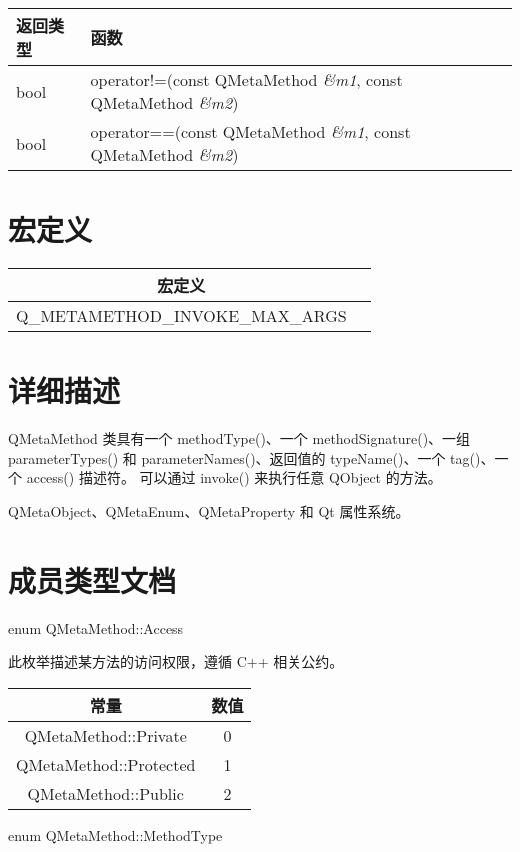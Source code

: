 \begin{tabular}{|l|l|}
\hline
返回类型 &	函数 \\ 
\hline
bool  &	operator!=(const QMetaMethod \emph{\&m1}, const QMetaMethod \emph{\&m2}) \\
\hline 
bool  &	operator==(const QMetaMethod \emph{\&m1}, const QMetaMethod \emph{\&m2})  \\
\hline
\end{tabular}

\section{宏定义}

\begin{tabular}{|c|c|}
	\hline
	宏定义 \\ 
	\hline
Q\_METAMETHOD\_INVOKE\_MAX\_ARGS \\ 
	\hline
	\end{tabular}

\section{详细描述}

QMetaMethod 类具有一个 methodType()、一个 methodSignature()、一组 parameterTypes() 和 parameterNames()、返回值的 typeName()、一个 tag()、一个 access() 描述符。
可以通过 invoke() 来执行任意 QObject 的方法。

\begin{notice}[另请参阅]
QMetaObject、QMetaEnum、QMetaProperty 和 Qt 属性系统。
\end{notice}

\section{成员类型文档}

enum QMetaMethod::Access

此枚举描述某方法的访问权限，遵循 C++ 相关公约。


\begin{tabular}{|c|c|}
	\hline
	常量 	& 数值  \\
	\hline
	QMetaMethod::Private  &	0 \\ 
	\hline
	QMetaMethod::Protected &	1 \\ 
	\hline
	QMetaMethod::Public &	2 \\ 
	\hline
	\end{tabular}

enum QMetaMethod::MethodType	

